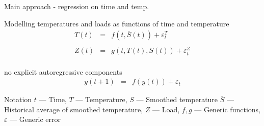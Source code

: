 
\begin{frame}{Main approach - regression on time and temp.}
  \begin{block}{Modelling temperatures and loads as functions of time and temperature}
    \vspace{-1\baselineskip}
    \begin{eqnarray*}
      T(t) & = & f(t, \bar{S}(t)) + \varepsilon^T_t \\
      \\
      Z(t) & = & g(t, T(t), S(t)) + \varepsilon^Z_t \\
    \end{eqnarray*}
    \vspace{-2\baselineskip}
  \end{block}
  \begin{block}{\ie no explicit autoregressive components \eg}
    \vspace{-1\baselineskip}
    \begin{eqnarray*}
      y(t+1) & = & f(y(t)) + \varepsilon_t
    \end{eqnarray*}
  \end{block}
  \begin{block}{Notation}
    $t$ --- Time, $T$ --- Temperature, $S$ --- Smoothed temperature $\bar{S}$ --- Historical average of smoothed temperature, $Z$ --- Load, $f,g$ --- Generic functions, $\varepsilon$ --- Generic error
  \end{block}
\end{frame}

